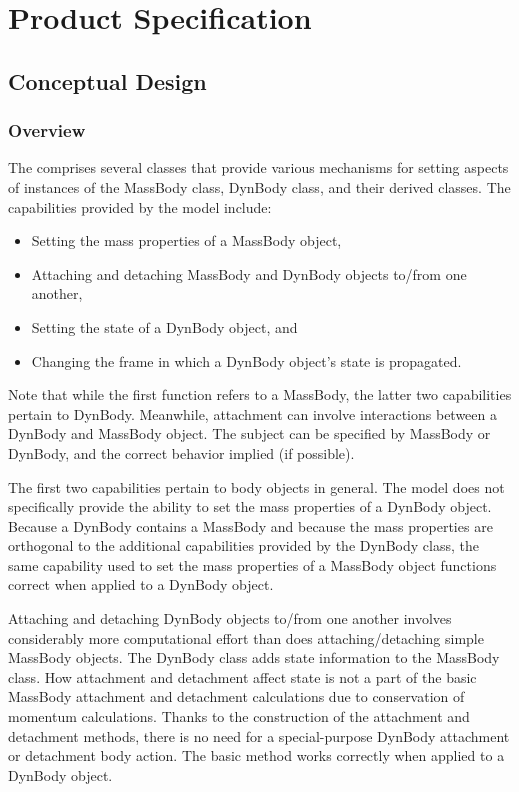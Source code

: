 %

\chapter{Product Specification}
\label{ch:overview:spec}

\section{Conceptual Design}
\subsection{Overview}
The \ModelDesc comprises several classes that provide various mechanisms
for setting aspects of instances of the MassBody class, DynBody class, and
their derived classes. The capabilities provided by the model include:
\begin{itemize}
\item Setting the mass properties of a MassBody object,
\item Attaching and detaching MassBody and DynBody objects to/from one another,
\item Setting the state of a DynBody object, and
\item Changing the frame in which a DynBody object's state is propagated.
\end{itemize}

Note that while the first function refers to a MassBody, the latter two
capabilities pertain to DynBody. Meanwhile, attachment can involve
interactions between a DynBody and MassBody object.
The subject can be specified by MassBody or DynBody, and the correct behavior
implied (if possible).

The first two capabilities pertain to body objects in general.
The model does not specifically provide the ability to set the mass properties of a DynBody object.
Because a DynBody contains a MassBody and because the mass properties are orthogonal
to the additional capabilities provided by the DynBody class,
the same capability used to set the mass properties
of a MassBody object functions correct when applied to a DynBody object.

Attaching and detaching DynBody objects to/from one another  involves
considerably more computational effort than does attaching/detaching
simple MassBody objects. The
DynBody class adds state information to the
MassBody class. How attachment and detachment affect state is not a part
of the basic MassBody attachment and detachment calculations due to
conservation of momentum calculations.
Thanks to the construction of the attachment and detachment methods,
there is no need for a special-purpose DynBody attachment or detachment
body action. The basic method works correctly when applied to a DynBody object.

